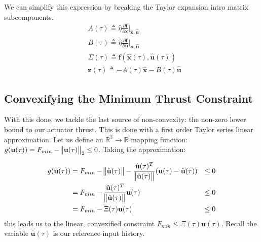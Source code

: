 We can simplify this expression by breaking the Taylor expansion intro matrix subcomponents. 
\begin{align}
& A(\tau) \triangleq \hat{\eta} \frac{\partial \mathbf{f}}{\partial \mathbf{x}}  \bigg\rvert_{\mathbf{\hat{x}}, \mathbf{\hat{u}}} \\
& B(\tau) \triangleq \hat{\eta} \frac{\partial \mathbf{f}}{\partial \mathbf{u}}  \bigg\rvert_{\mathbf{\hat{x}}, \mathbf{\hat{u}}} \\
& \Sigma(\tau) \triangleq \mathbf{f}(\hat{\mathbf{x}}(\tau), \hat{\mathbf{u}}(\tau)) \\
& \mathbf{z}(\tau) \triangleq -A(\tau)\mathbf{\hat{x}}- B(\tau)\mathbf{\hat{u}}
\end{align}


\subsection{Convexifying the Minimum Thrust Constraint}
With this done, we tackle the last source of non-convexity: the non-zero lower bound to our actuator thrust. This is done with a first order Taylor series linear approximation. Let us define an $\mathbb{R}^3 \rightarrow \mathbb{R}$ mapping function: $g(\mathbf{u}(\tau)) = F_{min} - \norm{\mathbf{u}(\tau)}_2 \leq 0$. Taking the approximation:

\begin{align}
	g(\mathbf{u}(\tau)) &= F_{min} - \norm{\hat{\mathbf{u}}(\tau)} - \frac{\hat{\mathbf{u}}(\tau)^T}{\norm{\hat{\mathbf{u}}(\tau)}}(\mathbf{u}(\tau) - \hat{\mathbf{u}}(\tau)) & \leq 0 \\
	&= F_{min} - \frac{\hat{\mathbf{u}}(\tau)^T}{\norm{\hat{\mathbf{u}}(\tau)}} \mathbf{u}(\tau)  & \leq 0\\
	&= F_{min} - \Xi(\tau)\mathbf{u}(\tau)  & \leq 0
\end{align}
this leads us to the linear, convexified constraint $F_{min} \leq \Xi(\tau)\mathbf{u}(\tau)$. Recall the variable $\hat{\mathbf{u}}(\tau)$ is our reference input history.






